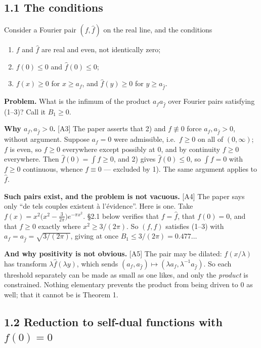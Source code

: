 \documentclass[11pt,reqno]{amsart}
\theoremstyle{plain}
\theoremstyle{definition}
\theoremstyle{remark}
\newcommand{\fh}{\widehat{f}}
\newcommand{\Ledger}[1]{{\scriptsize\textsf{[#1]}}}
\begin{document}
\subsection*{1.1 The conditions}

Consider a Fourier pair $(f,\fh)$ on the real line, and the conditions
\begin{enumerate}[label=\textbf{\arabic*)},leftmargin=2.4em]
\item $f$ and $\fh$ are real and even, not identically zero;
\item $f(0)\le0$ and $\fh(0)\le0$;
\item $f(x)\ge0$ for $x\ge a_f$, and $\fh(y)\ge0$ for $y\ge a_{\fh}$.
\end{enumerate}

\noindent\textbf{Problem.} What is the infimum of the product $a_fa_{\fh}$ over
Fourier pairs satisfying (1--3)? Call it $B_1\ge0$.

\begin{filled}
\textbf{Why $a_f,a_{\fh}>0$.} \Ledger{A3} The paper asserts that 2) and $f\not\equiv0$
force $a_f,a_{\fh}>0$, without argument. Suppose $a_f=0$ were admissible, i.e.\
$f\ge0$ on all of $(0,\infty)$; $f$ is even, so $f\ge0$ everywhere except possibly at
$0$, and by continuity $f\ge0$ everywhere. Then $\fh(0)=\int f\ge0$, and 2) gives
$\fh(0)\le0$, so $\int f=0$ with $f\ge0$ continuous, whence $f\equiv0$ --- excluded by
1). The same argument applies to $\fh$.
\end{filled}

\begin{filled}
\textbf{Such pairs exist, and the problem is not vacuous.} \Ledger{A4} The paper says
only ``de tels couples existent \`a l'\'evidence''. Here is one. Take
$f(x)=x^2\bigl(x^2-\tfrac{3}{2\pi}\bigr)e^{-\pi x^2}$. \S2.1 below verifies that
$f=\fh$, that $f(0)=0$, and that $f\ge0$ exactly where $x^2\ge3/(2\pi)$. So $(f,f)$
satisfies (1--3) with $a_f=a_{\fh}=\sqrt{3/(2\pi)}$, giving at once
$B_1\le3/(2\pi)=0.477\ldots$

\textbf{And why positivity is not obvious.} \Ledger{A5} The pair may be dilated:
$f(x/\lambda)$ has transform $\lambda\fh(\lambda y)$, which sends
$(a_f,a_{\fh})\mapsto(\lambda a_f,\lambda^{-1}a_{\fh})$. So each threshold separately
can be made as small as one likes, and only the \emph{product} is constrained.
Nothing elementary prevents the product from being driven to $0$ as well; that it
cannot be is Theorem 1.
\end{filled}

\subsection*{1.2 Reduction to self-dual functions with $f(0)=0$}
\end{document}
